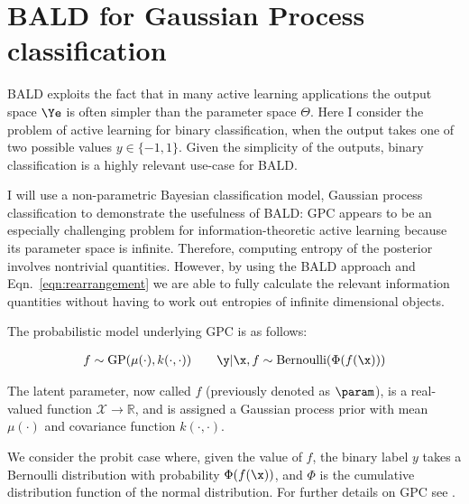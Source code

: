 
\section{BALD for Gaussian Process classification}

BALD exploits the fact that in many active learning applications the output space $\Ye$ is often simpler than the parameter space $\Theta$. Here I consider the problem of active learning for binary classification, when the output takes one of two possible values $y \in \{-1,1\}$. Given the simplicity of the outputs, binary classification is a highly relevant use-case for BALD.

I will use a non-parametric Bayesian classification model, Gaussian process classification \citep[GPC,][]{Rasmussen2006} to demonstrate the usefulness of BALD: GPC appears to be an especially challenging problem for information-theoretic active learning because its parameter space is infinite. Therefore, computing entropy of the posterior involves nontrivial quantities. However, by using the BALD approach and Eqn.\ \eqref{eqn:rearrangement} we are able to fully calculate the relevant information quantities without having to work out entropies of infinite dimensional objects. 


The probabilistic model underlying GPC is as follows:

\begin{align}
	f \sim \mathrm{GP}(\mu(\cdot),k(\cdot,\cdot)) \qquad \y\vert\x,f \sim\mathrm{Bernoulli}(\Phi(f(\x))) \label{eqn:GPC_model}
\end{align}

The latent parameter, now called $f$ (previously denoted as $\param$), is a real-valued function $\mathcal{X}\rightarrow\mathbb{R}$, and is assigned a Gaussian process prior with mean $\mu(\cdot)$ and covariance function $k(\cdot,\cdot)$.


We consider the probit case where, given the value of $f$, the binary label $y$ takes a Bernoulli distribution with probability $\Phi(f(\x))$, and $\Phi$ is the cumulative distribution function of the normal distribution. For further details on GPC see \citep{Rasmussen2006}.

